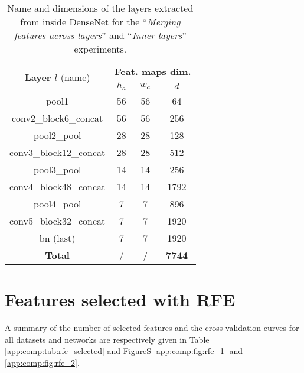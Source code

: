 \begin{table}
\centering
\begin{tabular}{|c|ccc|}
\hline
\multirow{2}{*}{\textbf{Layer $l$} (name)} & \multicolumn{3}{c|}{\textbf{Feat. maps dim.}}\\
& $h_a$ & $w_a$ & $d$ \\
\hline
pool1 & 56 & 56 & 64 \\
conv2\_block6\_concat & 56 & 56 & 256 \\
pool2\_pool & 28 & 28 & 128 \\
conv3\_block12\_concat & 28 & 28 & 512 \\
pool3\_pool & 14 & 14 & 256 \\
conv4\_block48\_concat & 14 & 14 & 1792 \\
pool4\_pool & 7 & 7 & 896 \\
conv5\_block32\_concat & 7 & 7 & 1920 \\
bn (last)& 7 & 7 & 1920 \\
\hline
\textbf{Total} & / & / & \textbf{7744} \\
\hline 
\end{tabular}
\caption{Name and dimensions of the layers extracted from inside DenseNet for the ``\textit{Merging features across layers}'' and ``\textit{Inner layers}'' experiments.}
\label{app:comp:tab:inner_layers_densenet}
\end{table}


\section{Features selected with RFE}
\label{app:comp:sec:rfe_selection}
A summary of the number of selected features and the cross-validation curves for all datasets and networks are respectively given in Table \ref{app:comp:tab:rfe_selected} and FigureS \ref{app:comp:fig:rfe_1} and \ref{app:comp:fig:rfe_2}.

